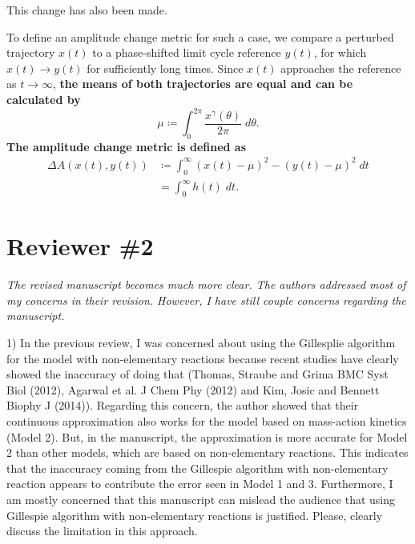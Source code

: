 \documentclass[11pt, letterpaper]{article}
\newenvironment{reviewer}{\itshape\color{gray}}{}
\newenvironment{manuscript}[1]{\begin{center}\begin{tcolorbox}[colback=green!5!white,colframe=green!75!black,width=0.8\textwidth,title={#1},breakable,fonttitle=\bfseries]}{\end{tcolorbox}\end{center}}
\begin{document}
This change has also been made.

\begin{manuscript}{Page 7}
To define an amplitude change metric for such a case, we compare a perturbed trajectory $x(t)$ to a phase-shifted limit cycle reference $y(t)$, for which $x(t) \to y(t)$ for sufficiently long times.
Since $x(t)$ approaches the reference as $t \to \infty$, {\bfseries the means of both trajectories are equal and can be calculated by
\begin{equation}
  \mu \coloneqq \int_0^{2\pi} \frac{x^\gamma(\theta)}{2\pi} \; d\theta.
  \tag{20}
\end{equation}
The amplitude change metric is defined as}
\begin{equation}
  \begin{aligned}
    \Delta A (x(t), y(t)) &\coloneqq \int_0^\infty (x(t) - \mu)^2 - (y(t) - \mu)^2 \; dt\\
    &= \int_0^\infty h(t) \; dt.
  \end{aligned}
  \tag{21}
\end{equation}
\end{manuscript}

\section*{Reviewer \#2}
\begin{reviewer}
The revised manuscript becomes much more clear. The authors addressed most of my concerns in their revision. However, I have still couple concerns regarding the manuscript. 
 
1) In the previous review, I was concerned about using the Gillesplie algorithm for the model with non-elementary reactions because recent studies have clearly showed the inaccuracy of doing that (Thomas, Straube and Grima BMC Syst Biol (2012), Agarwal et al. J Chem Phy (2012) and Kim, Josic and Bennett Biophy J (2014)). Regarding this concern, the author showed that their continuous approximation also works for the model based on mass-action kinetics (Model 2). But, in the manuscript, the approximation is more accurate for Model 2 than other models, which are based on non-elementary reactions. This indicates that the inaccuracy coming from the Gillespie algorithm with non-elementary reaction appears to contribute the error seen in Model 1 and 3. Furthermore, I am mostly concerned that this manuscript can mislead the audience that using Gillespie algorithm with non-elementary reactions is justified. Please, clearly discuss the limitation in this approach. 
\end{reviewer}
\end{document}
